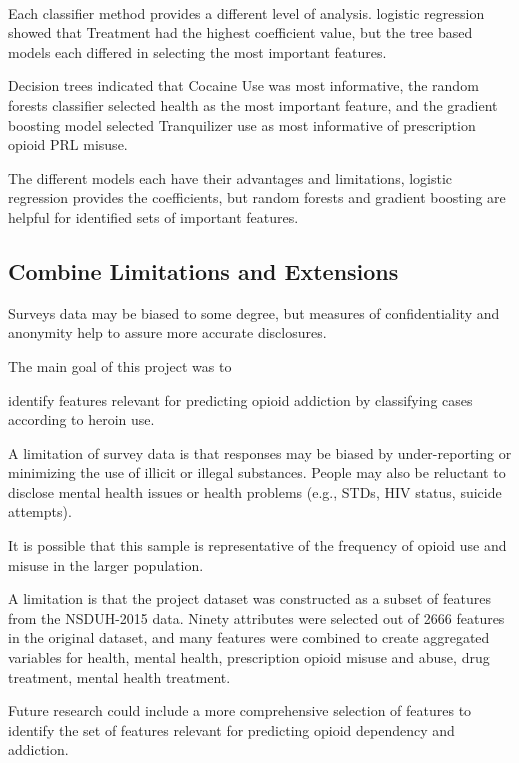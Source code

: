 \\\documentclass[sigconf]{acmart}
\begin{document}
Each classifier method provides a different level of
analysis. 
logistic regression showed that Treatment had the highest coefficient value, but 
the tree based models each differed in selecting the most important features. 

Decision trees indicated that Cocaine Use was most informative, the random 
forests classifier selected health as the most important feature, and the 
gradient boosting model selected 
Tranquilizer use as most informative of prescription opioid PRL misuse. 

The different models each have their advantages and limitations, logistic regression provides the coefficients, but random forests and gradient boosting are helpful for 
identified sets of important features.

\subsection{Combine Limitations and Extensions}

Surveys data may be biased to some degree, but measures of confidentiality and 
anonymity help to assure more accurate disclosures. 

The main goal of this project was to 


identify features relevant for predicting 
opioid addiction by classifying cases according to heroin use. 

A limitation of survey data is that responses may be biased by under-reporting or minimizing the use of illicit or illegal substances. People may also be reluctant to disclose mental health issues or health problems (e.g., STDs, HIV status, suicide attempts). 

It is possible that this sample is representative of the frequency of opioid use 
and misuse in the larger population.


A limitation is that the project dataset was constructed as a subset of 
features from the NSDUH-2015 data. 
Ninety attributes were selected out of 2666 features in the original dataset, 
and many features were combined to create aggregated variables for health, 
mental health, prescription opioid misuse and abuse, drug treatment, mental health
treatment. 

Future research could include a more comprehensive selection of
features to identify the set of features relevant for predicting opioid
dependency and addiction. 
\end{document}
